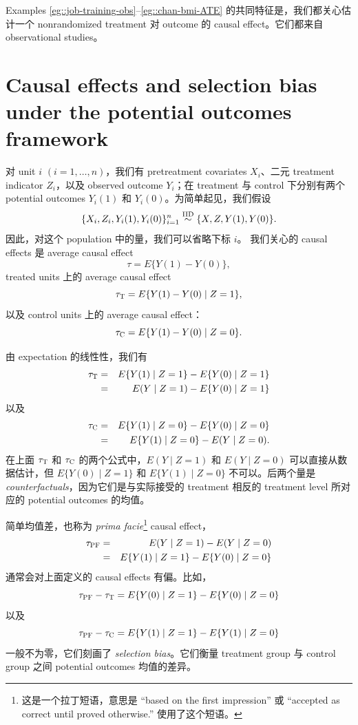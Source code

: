 Examples \ref{eg::job-training-obs}--\ref{eg::chan-bmi-ATE} 的共同特征是，我们都关心估计一个 nonrandomized treatment 对 outcome 的 causal effect。它们都来自 observational studies。 
 
 
\section{Causal effects and selection bias under the potential outcomes framework} 
 \label{sec::selection-bias-randomization}

 
 
对 unit $i$ $(i=1,\ldots, n)$，我们有 pretreatment covariates $X_i$、二元 treatment indicator $Z_i$，以及 observed outcome $Y_i$；在 treatment 与 control 下分别有两个 potential outcomes $Y_i(1)$ 和 $Y_i(0)$。为简单起见，我们假设   
$$
\{X_i, Z_i, Y_i(1),  Y_i(0)  \}_{i=1}^n \stackrel{\textup{IID}}{\sim} \{  X, Z, Y(1),  Y(0) \} .
$$ 
因此，对这个 population 中的量，我们可以省略下标 $i$。  
我们关心的 causal effects 是 average causal effect
$$
\tau = E\{  Y(1) - Y(0)  \},
$$
treated units 上的 average causal effect
$$
\tau_\textsc{T} =  E\{  Y(1) - Y(0)  \mid Z = 1 \},
$$
以及 control units 上的 average causal effect：
$$
\tau_\textsc{C} =  E\{  Y(1) - Y(0)  \mid Z = 0 \}. 
$$ 

由 expectation 的线性性，我们有
\begin{eqnarray*}
\tau_\textsc{T} &=&  E\{  Y(1)    \mid Z = 1 \} - E\{   Y(0)  \mid Z = 1 \}  \\
&=&  E(  Y    \mid Z = 1 ) - E\{   Y(0)  \mid Z = 1 \}
\end{eqnarray*}
以及
\begin{eqnarray*}
 \tau_\textsc{C} &=&  E\{  Y(1)    \mid Z = 0 \} - E\{   Y(0)  \mid Z = 0 \} \\
 &=&  E\{  Y(1)    \mid Z = 0 \} - E(  Y   \mid Z = 0 ).
\end{eqnarray*}
 在上面 $\tau_\textsc{T} $ 和 $\tau_\textsc{C} $ 的两个公式中，$E(Y    \mid Z = 1 ) $ 和 $E(   Y   \mid Z = 0 ) $ 可以直接从数据估计，但 $E\{   Y(0)  \mid Z = 1 \}$ 和 $E\{  Y(1)    \mid Z = 0 \}$ 不可以。后两个量是 {\it counterfactuals}，因为它们是与实际接受的 treatment 相反的 treatment level 所对应的 potential outcomes 的均值。 
 

简单均值差，也称为 {\it prima facie}\footnote{这是一个拉丁短语，意思是 ``based on the first impression'' 或 ``accepted as correct until proved otherwise.'' 
\citet{holland1986statistics} 使用了这个短语。 
} causal effect，
\begin{eqnarray*}
\tau_\textsc{PF} &=& E(  Y    \mid Z = 1 )  - E(   Y   \mid Z = 0 )   \\
&=& E\{  Y(1)    \mid Z = 1 \}  - E\{   Y(0)  \mid Z = 0 \} 
\end{eqnarray*}
通常会对上面定义的 causal effects 有偏。比如，
 $$
 \tau_\textsc{PF} - \tau_\textsc{T} = E\{   Y(0)  \mid Z = 1 \} - E\{   Y(0)  \mid Z = 0 \} 
 $$
以及
 $$
  \tau_\textsc{PF} - \tau_\textsc{C} =  E\{   Y(1)  \mid Z = 1 \} - E\{   Y(1)  \mid Z = 0 \} 
 $$
一般不为零，它们刻画了 {\it selection bias}。它们衡量 treatment group 与 control group 之间 potential outcomes 均值的差异。 
 
